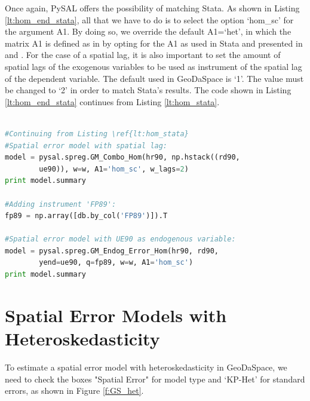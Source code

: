 \documentclass{article}
\begin{document}
Once again, PySAL offers the possibility of matching Stata. As shown in Listing \ref{lt:hom_end_stata}, all that we have to do is to select the option `hom\_sc' for the argument A1. By doing so, we override the default A1=`het', in which the matrix A1 is defined as in \citet{Arraiz10} by opting for the A1 as used in Stata and presented in \citet{Drukker10} and \citet{Drukker11}. For the case of a spatial lag, it is also important to set the amount of spatial lags of the exogenous variables to be used as instrument of the spatial lag of the dependent variable. The default used in GeoDaSpace is `1'. The value must be changed to `2' in order to match Stata's results. The code shown in Listing \ref{lt:hom_end_stata} continues from Listing \ref{lt:hom_stata}.

\begin{code}
\begin{lstlisting}[label=lt:hom_end_stata,caption=Using PySAL to match the results of spatial error models with endogenous variables or spatial lag from Stata,language=Python]

#Continuing from Listing \ref{lt:hom_stata}
#Spatial error model with spatial lag:
model = pysal.spreg.GM_Combo_Hom(hr90, np.hstack((rd90,
        ue90)), w=w, A1='hom_sc', w_lags=2)
print model.summary

#Adding instrument 'FP89':
fp89 = np.array([db.by_col('FP89')]).T

#Spatial error model with UE90 as endogenous variable:
model = pysal.spreg.GM_Endog_Error_Hom(hr90, rd90,
        yend=ue90, q=fp89, w=w, A1='hom_sc')
print model.summary

\end{lstlisting}
\end{code}

\section{Spatial Error Models with Heteroskedasticity}
To estimate a spatial error model with heteroskedasticity in GeoDaSpace, we need to check the boxes "Spatial Error" for model type and `KP-Het' for standard errors, as shown in Figure \ref{f:GS_het}.
\end{document}
